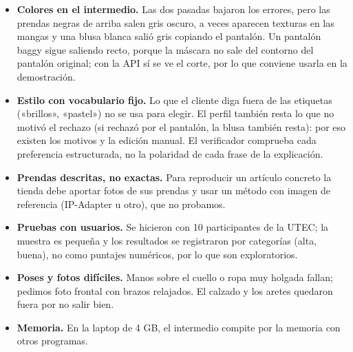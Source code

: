 \documentclass[11pt,letterpaper]{article}
\begin{document}
\begin{itemize}
\item \textbf{Colores en el intermedio.} Las dos pasadas bajaron los errores, pero las prendas negras de arriba salen gris
oscuro, a veces aparecen texturas en las mangas y una blusa blanca salió gris copiando el pantalón. Un pantalón baggy
sigue saliendo recto, porque la máscara no sale del contorno del pantalón original; con la API sí se ve el corte, por lo
que conviene usarla en la demostración.
\item \textbf{Estilo con vocabulario fijo.} Lo que el cliente diga fuera de las etiquetas («brillos», «pastel») no se usa
para elegir. El perfil también resta lo que no motivó el rechazo (si rechazó por el pantalón, la blusa también resta):
por eso existen los motivos y la edición manual. El verificador comprueba cada preferencia estructurada, no la polaridad
de cada frase de la explicación.
\item \textbf{Prendas descritas, no exactas.} Para reproducir un artículo concreto la tienda debe aportar fotos de sus
prendas y usar un método con imagen de referencia (IP-Adapter u otro), que no probamos.
\item \textbf{Pruebas con usuarios.} Se hicieron con 10 participantes de la UTEC; la muestra es pequeña y los resultados se registraron por categorías (alta, buena), no como puntajes numéricos, por lo que son exploratorios.
\item \textbf{Poses y fotos difíciles.} Manos sobre el cuello o ropa muy holgada fallan; pedimos foto frontal con brazos
relajados. El calzado y los aretes quedaron fuera por no salir bien.
\item \textbf{Memoria.} En la laptop de 4 GB, el intermedio compite por la memoria con otros programas.
\end{itemize}
\end{document}
